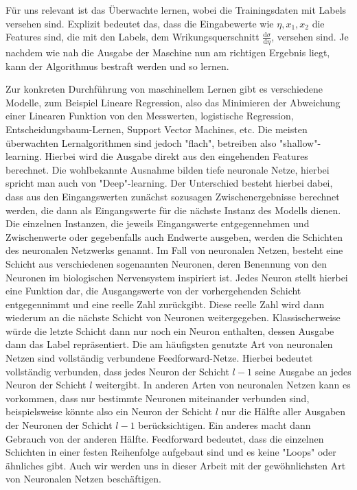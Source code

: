 Für uns relevant ist das Überwachte lernen, wobei die Trainingsdaten mit Labels versehen sind. Explizit bedeutet das, dass die Eingabewerte wie $\eta, x_1, x_2$ die Features sind, die mit den Labels, dem Wrikungsquerschnitt $\frac{\text{d}\sigma}{\text{d}\eta}$, versehen sind. Je nachdem wie nah die Ausgabe der Maschine nun am richtigen Ergebnis liegt, kann der Algorithmus bestraft werden und so lernen. 

Zur konkreten Durchführung von maschinellem Lernen gibt es verschiedene Modelle, zum Beispiel Lineare Regression, also das Minimieren der Abweichung einer Linearen Funktion von den Messwerten, logistische Regression, Entscheidungsbaum-Lernen, Support Vector Machines, etc. Die meisten überwachten Lernalgorithmen sind jedoch "flach", betreiben also "shallow"-learning. Hierbei wird die Ausgabe direkt aus den eingehenden Features berechnet. Die wohlbekannte Ausnahme bilden tiefe neuronale Netze, hierbei spricht man auch von "Deep"-learning. Der Unterschied besteht hierbei dabei, dass aus den Eingangswerten zunächst sozusagen Zwischenergebnisse berechnet werden, die dann als Eingangswerte für die nächste Instanz des Modells dienen. Die einzelnen Instanzen, die jeweils Eingangswerte entgegennehmen und Zwischenwerte oder gegebenfalls auch Endwerte ausgeben, werden die Schichten des neuronalen Netzwerks genannt. Im Fall von neuronalen Netzen, besteht eine Schicht aus verschiedenen sogenannten Neuronen, deren Benennung von den Neuronen im biologischen Nervensystem inspiriert ist. Jedes Neuron stellt hierbei eine Funktion dar, die Ausgangswerte von der vorhergehenden Schicht entgegennimmt und eine reelle Zahl zurückgibt. Diese reelle Zahl wird dann wiederum an die nächste Schicht von Neuronen weitergegeben. Klassischerweise würde die letzte Schicht dann nur noch ein Neuron enthalten, dessen Ausgabe dann das Label repräsentiert. Die am häufigsten genutzte Art von neuronalen Netzen sind vollständig verbundene Feedforward-Netze. Hierbei bedeutet vollständig verbunden, dass jedes Neuron der Schicht $l-1$ seine Ausgabe an jedes Neuron der Schicht $l$ weitergibt. In anderen Arten von neuronalen Netzen kann es vorkommen, dass nur bestimmte Neuronen miteinander verbunden sind, beispielsweise könnte also ein Neuron der Schicht $l$ nur die Hälfte aller Ausgaben der Neuronen der Schicht $l-1$ berücksichtigen. Ein anderes macht dann Gebrauch von der anderen Hälfte. Feedforward bedeutet, dass die einzelnen Schichten in einer festen Reihenfolge aufgebaut sind und es keine "Loops" oder ähnliches gibt. Auch wir werden uns in dieser Arbeit mit der gewöhnlichsten Art von Neuronalen Netzen beschäftigen. 

